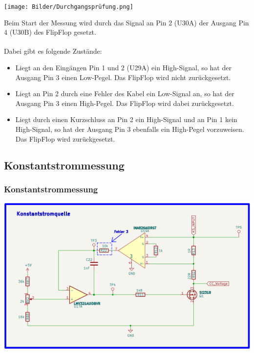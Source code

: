 \begin{center}
\texttt{[image: Bilder/Durchgangsprüfung.png]}
\end{center}

Beim Start der Messung wird durch das Signal an Pin 2 (U30A) der Ausgang Pin 4 (U30B) des FlipFlop gesetzt. 
\\
\\
Dabei gibt es folgende Zustände:

\begin{itemize}
	\item{Liegt an den Eingängen Pin 1 und 2 (U29A) ein High-Signal,  so hat der Ausgang Pin 3 einen Low-Pegel. Das FlipFlop wird nicht zurückgesetzt.}
	
	\item{Liegt an Pin 2 durch eine Fehler des Kabel ein Low-Signal an, so hat der Ausgang Pin 3 einen High-Pegel. Das FlipFlop wird dabei zurückgesetzt.}
	
	\item{Liegt durch einen Kurzschluss an Pin 2 ein High-Signal und an Pin 1 kein High-Signal, so hat der Ausgang Pin 3 ebenfalls ein High-Pegel vorzuweisen. Das FlipFlop wird zurückgesetzt.}
\end{itemize}

\newpage
\subsection{Konstantstrommessung}

\subsubsection{Konstantstrommessung}
\begin{center}
\includegraphics[width=16cm]{Bilder/Konstantstromquelle.png}
\end{center}

